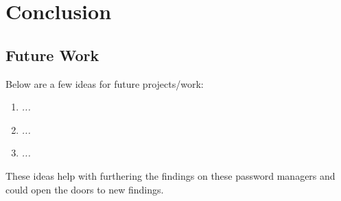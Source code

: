 \section{Conclusion}

\subsection{Future Work}
Below are a few ideas for future projects/work:
\begin{enumerate}
    \item \textit{...}
    \item \textit{...}
    \item \textit{...}
\end{enumerate}
These ideas help with furthering the findings on these password managers and could open the doors to new findings.